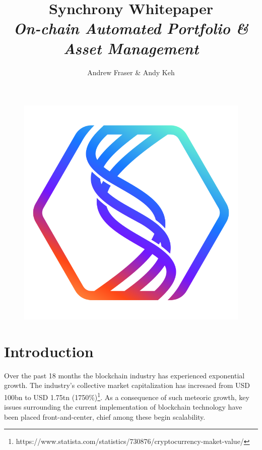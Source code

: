 \documentclass[10pt]{article}
\title{%
	\textbf{Synchrony Whitepaper}\\
	\emph{On-chain Automated Portfolio \& Asset Management}}
\author{Andrew Fraser \& Andy Keh}
\begin{document}
	\maketitle
	\begin{center}
		\begin{figure}[h]
			\includegraphics[scale=0.75]{SYNCHRONY-LOGO.png}
			\centering
		\end{figure}
	\end{center}

	\newpage
	\tableofcontents

	\newpage
		\section{Introduction}
			Over the past 18 months the blockchain industry has experienced exponential growth. The
			industry's collective market capitalization has incresaed from USD 100bn to USD 1.75tn
			(1750\%)\footnote[1]{https://www.statista.com/statistics/730876/cryptocurrency-maket-value/}.
			As a consequence of such meteoric growth, key issues surrounding the current
			implementation of blockchain technology have been placed front-and-center, chief among
			these begin scalability. 
\end{document}
